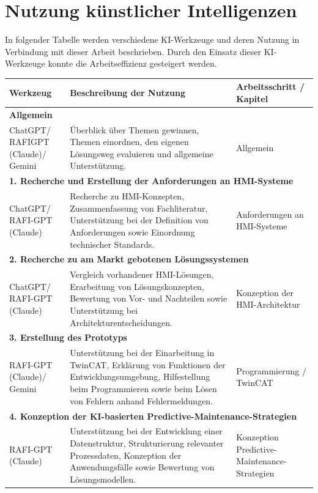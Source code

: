 \section*{Nutzung künstlicher Intelligenzen}
In folgender Tabelle werden verschiedene KI-Werkzeuge und deren Nutzung in Verbindung mit dieser Arbeit beschrieben. Durch den Einsatz dieser KI-Werkzeuge konnte die Arbeitseffizienz gesteigert werden.

\begin{tabular}{|p{2.2cm}|p{9.5cm}|p{3.5cm}|}
  \hline
  \textbf{Werkzeug} & \textbf{Beschreibung der Nutzung} & \textbf{Arbeitsschritt / Kapitel} \\
  \hline
  \multicolumn{3}{|l|}{\textbf{Allgemein}} \\
  \hline
  ChatGPT/ RAFIGPT (Claude)/ Gemini & Überblick über Themen gewinnen, Themen einordnen, den eigenen Lösungsweg evaluieren und allgemeine Unterstützung. & Allgemein \\
  \hline
  \multicolumn{3}{|l|}{\textbf{1. Recherche und Erstellung der Anforderungen an HMI-Systeme}} \\
  \hline
  ChatGPT/ RAFI-GPT (Claude) &
  Recherche zu HMI-Konzepten, Zusammenfassung von Fachliteratur, Unterstützung bei der Definition von Anforderungen sowie Einordnung technischer Standards. &
  Anforderungen an HMI-Systeme \\
  \hline
  \multicolumn{3}{|l|}{\textbf{2. Recherche zu am Markt gebotenen Lösungssystemen}} \\
  \hline
  ChatGPT/ RAFI-GPT (Claude) &
  Vergleich vorhandener HMI-Lösungen, Erarbeitung von Lösungskonzepten, Bewertung von Vor- und Nachteilen sowie Unterstützung bei Architekturentscheidungen. &
  Konzeption der HMI-Architektur \\
  \hline
  \multicolumn{3}{|l|}{\textbf{3. Erstellung des Prototyps}} \\
  \hline
  RAFI-GPT (Claude)/ Gemini &
  Unterstützung bei der Einarbeitung in TwinCAT, Erklärung von Funktionen der Entwicklungsumgebung, Hilfestellung beim Programmieren sowie beim Lösen von Fehlern anhand Fehlermeldungen. &
  Programmierung / TwinCAT \\
  \hline
  \multicolumn{3}{|l|}{\textbf{4. Konzeption der KI-basierten Predictive-Maintenance-Strategien}} \\
  \hline
  RAFI-GPT (Claude) &
  Unterstützung bei der Entwicklung einer Datenstruktur, Strukturierung relevanter Prozessdaten, Konzeption der Anwendungsfälle sowie Bewertung von Lösungsmodellen. &
  Konzeption Predictive-Maintenance-Strategien \\

\end{tabular}
